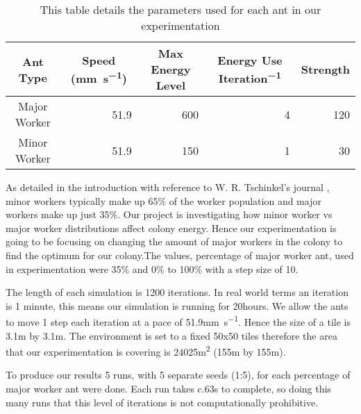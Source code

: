 \begin{table}[htb]
  \centering
  \caption{This table details the parameters used for each ant in our experimentation}
  \label{tab:ant-parameters}
  \begin{tabular}{@{}crrrr@{}}
  \toprule
  Ant Type     & \multicolumn{1}{c}{Speed (\si{mm.s^{-1}})} & \multicolumn{1}{c}{Max Energy Level} & \multicolumn{1}{c}{Energy Use \si{Iteration^{-1}}} & \multicolumn{1}{c}{Strength} \\ \midrule
  Major Worker & 51.9                             &  600                                    & 4     & 120                                    \\ \midrule
  Minor Worker & 51.9                              & 150                                     & 1    & 30                                     \\ \bottomrule
  \end{tabular}
\end{table}

As detailed in the introduction with reference to W. R. Tschinkel's journal \cite{Tschinkel1988}, minor workers typically make up 65\% of the worker population and major workers make up just 35\%. Our project is investigating how minor worker vs major worker distributions affect colony energy. Hence our experimentation is going to be focusing on changing the amount of major workers in the colony to find the optimum for our colony.The values, percentage of major worker ant, used in experimentation were 35\% and 0\% to 100\% with a step size of 10.\par
 The length of each simulation is 1200 iterations. In real world terms an iteration is 1 minute, this means our simulation is running for 20hours. We allow the ants to move 1 step each iteration at a pace of 51.9\si{mm.s^{-1}}. Hence the size of a tile is 3.1\si{m} by 3.1\si{m}. The environment is set to a fixed 50x50 tiles therefore the area that our experimentation is covering is 24025\si{m^2} (155\si{m} by 155\si{m}).\par
 To produce our results 5 runs, with 5 separate seeds (1:5), for each percentage of major worker ant were done. Each run takes c.63\si{s} to complete, so doing this many runs that this level of iterations is not computationally prohibitive.\par

